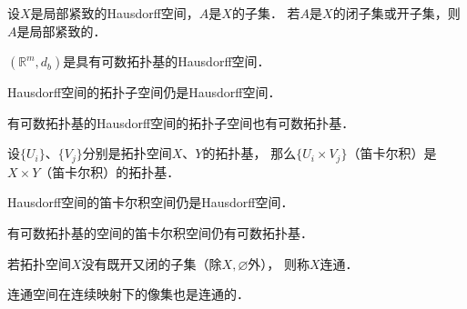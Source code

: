 \begin{proposition}
    设$X$是局部紧致的Hausdorff空间，$A$是$X$的子集．
    若$A$是$X$的闭子集或开子集，则$A$是局部紧致的．
\end{proposition}


\begin{proposition}
    $(\mathbb{R}^m, d_b)$是具有可数拓扑基的Hausdorff空间．
\end{proposition}

\begin{proposition}
    Hausdorff空间的拓扑子空间仍是Hausdorff空间．
\end{proposition}


\begin{proposition}\label{chtop:thm_hcb}
    有可数拓扑基的Hausdorff空间的拓扑子空间也有可数拓扑基．
\end{proposition}

\begin{proposition}\label{chtop:thm_uvb}
    设$\{U_i\}$、$\{V_j\}$分别是拓扑空间$X$、$Y$的拓扑基，
    那么$\{U_i\times V_j\}$（笛卡尔积）是$X\times Y$（笛卡尔积）的拓扑基．
\end{proposition}

\begin{proposition}\label{chtop:thm_cph}
    Hausdorff空间的笛卡尔积空间仍是Hausdorff空间．
\end{proposition}

\begin{proposition}\label{chtop:thm_ccb}
    有可数拓扑基的空间的笛卡尔积空间仍有可数拓扑基．
\end{proposition}




\begin{definition}\label{chtop:def_connection}
    若拓扑空间$X$没有既开又闭的子集（除$X,\varnothing$外），
    则称$X${\heiti 连通}．
\end{definition}

\begin{proposition}
    连通空间在连续映射下的像集也是连通的．
\end{proposition}

